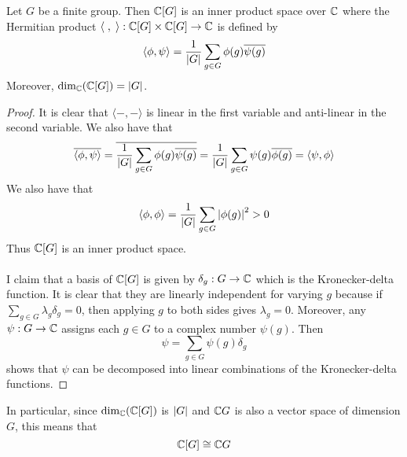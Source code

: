 \documentclass[a4paper]{article}
\begin{document}
\begin{thm}{}{} Let $G$ be a finite group. Then $\mathbb{C}[G]$ is an inner product space over $\mathbb{C}$ where the Hermitian product $\langle\;,\;\rangle:\mathbb{C}[G]\times \mathbb{C}[G]\to\mathbb{C}$ is defined by $$\langle \phi,\psi\rangle=\frac{1}{\abs{G}}\sum_{g\in G}\phi(g)\overline{\psi(g)}$$
Moreover, $\dim_{\mathbb{C}}(\mathbb{C}[G])=\abs{G}$. \tcbline
\begin{proof}
It is clear that $\langle-,-\rangle$ is linear in the first variable and anti-linear in the second variable. We also have that $$\overline{\langle\phi,\psi\rangle}=\overline{\frac{1}{\abs{G}}\sum_{g\in G}\phi(g)\overline{\psi(g)}}=\frac{1}{\abs{G}}\sum_{g\in G}\psi(g)\overline{\phi(g)}=\langle\psi,\phi\rangle$$ We also have that $$\langle\phi,\phi\rangle=\frac{1}{\abs{G}}\sum_{g\in G}\abs{\phi(g)}^2>0$$ Thus $\mathbb{C}[G]$ is an inner product space. \\~\\

I claim that a basis of $\mathbb{C}[G]$ is given by $\delta_g:G\to\mathbb{C}$ which is the Kronecker-delta function. It is clear that they are linearly independent for varying $g$ because if $\sum_{g\in G}\lambda_g\delta_g=0$, then applying $g$ to both sides gives $\lambda_g=0$. Moreover, any $\psi:G\to\mathbb{C}$ assigns each $g\in G$ to a complex number $\psi(g)$. Then $$\psi=\sum_{g\in G}\psi(g)\delta_g$$ shows that $\psi$ can be decomposed into linear combinations of the Kronecker-delta functions. 
\end{proof}
\end{thm}

In particular, since $\dim_{\mathbb{C}}(\mathbb{C}[G])$ is $\abs{G}$ and $\mathbb{C} G$ is also a vector space of dimension $G$, this means that $$\mathbb{C}[G]\cong\mathbb{C} G$$
\end{document}
